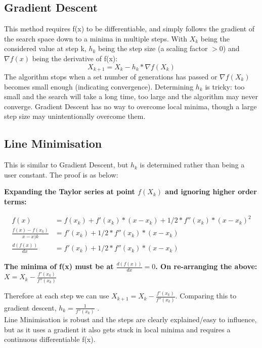 \subsection{Gradient Descent}
This method requires f(x) to be differentiable, and simply follows the gradient of the search space down to a minima in multiple steps. With $X_k$ being the considered value at step k, $h_k$ being the step size (a scaling factor $> 0$) and $\nabla f(x)$ being the derivative of f(x):
\begin{equation}
    X_{k+1} = X_k - h_k * \nabla f(X_k)
\end{equation}
The algorithm stops when a set number of generations has passed or $\nabla f(X_k)$ becomes small enough (indicating convergence). Determining $h_k$ is tricky: too small and the search will take a long time, too large and the algorithm may never converge. Gradient Descent has no way to overcome local minima, though a large step size may unintentionally overcome them.
\newpage
\subsection{Line Minimisation}
This is similar to Gradient Descent, but $h_k$ is determined rather than being a user constant. The proof is as below:
\begin{center}
    \textbf{Expanding the Taylor series at point $f(X_k)$ and ignoring higher order terms:} \\
\end{center}
\begin{align}
    f(x) &= f(x_k) + f'(x_k) * (x-x_k) + 1/2 * f''(x_k) * (x-x_k)^2 \nonumber \\
    \frac{f(x) - f(x_k)}{x-x)k} &= f'(x_k) + 1/2 * f''(x_k) * (x-x_k) \nonumber \\
    \frac{d(f(x))}{dx} &= f'(x_k) + 1/2 * f''(x_k) * (x-x_k) \nonumber 
\end{align}
\begin{center}
    \textbf{The minima of f(x) must be at $\frac{d(f(x))}{dx} = 0$. On re-arranging the above:} \\
    $X = X_k - \frac{f'(x_k)}{f''(x_k)}$ \\
\end{center}
Therefore at each step we can use $X_{k+1} = X_k - \frac{f'(x_k)}{f''(x_k)}$. Comparing this to gradient descent, $h_k = \frac{1}{f''(x_k)}$ . \\
Line Minimisation is robust and the steps are clearly explained/easy to influence, but as it uses a gradient it also gets stuck in local minima and requires a continuous differentiable f(x).
 

